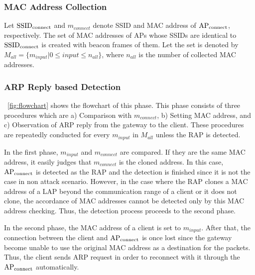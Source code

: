 \documentclass[conference]{IEEEtran}
\newcommand{\SSID}{\rm SSID_{connect}}
\newcommand{\tarAP}{\rm AP_{connect}}
\newcommand{\tarMAC}{m_{connect}}
\newcommand{\inputMAC}{m_{input}}
\begin{document}
\subsubsection{MAC Address Collection}
Let $\SSID$ and $\tarMAC$ denote SSID and MAC address of $\tarAP$, respectively.
The set of MAC addresses of APs whose SSIDs are identical to $\SSID$  is created with beacon frames of them.
Let the set is denoted by $M_{all}=\{m_{input}|0\le input \le n_{all}  \}$, where $n_{all}$ is the number of collected MAC addresses.

\subsubsection{ARP Reply based Detection}
\figurename~\ref{fig:flowchart} shows the flowchart of this phase.
This phase consists of three procedures which are a) Comparison with $\tarMAC$, b) Setting MAC address, and c) Observation of ARP reply from the gateway to the client.
These procedures are repeatedly conducted for every $m_{input}$ in $M_{all}$ unless the RAP is detected.

In the first phase, $\inputMAC$ and $\tarMAC$ are compared.
If they are the same MAC address, it easily judges that $\tarMAC$ is the cloned address.
In this case, $\tarAP$ is detected as the RAP and the detection is finished since it is not the case in non attack scenario.
However, in the case where the RAP clones a MAC address of a LAP beyond the communication range of a client or it does not clone, the accordance of MAC addresses cannot be detected only by this MAC address checking.
Thus, the detection process proceeds to the second phase.

In the second phase, the MAC address of a client is set to $\inputMAC$.
After that, the connection between the client and $\tarAP$ is once lost since the gateway become unable to use the original MAC address as a destination for the packets.
Thus, the client sends ARP request in order to reconnect with it through the $\tarAP$ automatically.
\end{document}
